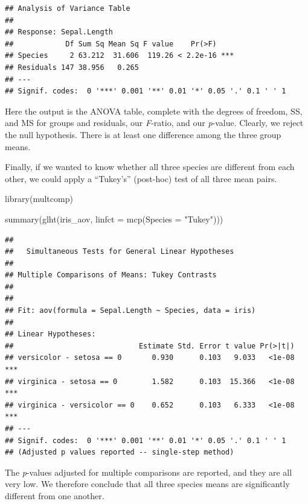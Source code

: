 \documentclass[
]{book}
\newenvironment{Shaded}{\begin{snugshade}}{\end{snugshade}}
\newcommand{\AttributeTok}[1]{\textcolor[rgb]{0.77,0.63,0.00}{#1}}
\newcommand{\FunctionTok}[1]{\textcolor[rgb]{0.00,0.00,0.00}{#1}}
\newcommand{\NormalTok}[1]{#1}
\newcommand{\StringTok}[1]{\textcolor[rgb]{0.31,0.60,0.02}{#1}}
\begin{document}
\begin{verbatim}
## Analysis of Variance Table
## 
## Response: Sepal.Length
##            Df Sum Sq Mean Sq F value    Pr(>F)    
## Species     2 63.212  31.606  119.26 < 2.2e-16 ***
## Residuals 147 38.956   0.265                      
## ---
## Signif. codes:  0 '***' 0.001 '**' 0.01 '*' 0.05 '.' 0.1 ' ' 1
\end{verbatim}

Here the output is the ANOVA table, complete with the degrees of freedom, SS, and MS for groups and residuals, our \emph{F}-ratio, and our \emph{p}-value. Clearly, we reject the null hypothesis. There is at least one difference among the three group means.

Finally, if we wanted to know whether all three species are different from each other, we could apply a ``Tukey's'' (post-hoc) test of all three mean pairs.

\begin{Shaded}
\begin{Highlighting}[]
\FunctionTok{library}\NormalTok{(multcomp)}
\end{Highlighting}
\end{Shaded}

\begin{Shaded}
\begin{Highlighting}[]
\FunctionTok{summary}\NormalTok{(}\FunctionTok{glht}\NormalTok{(iris\_aov, }\AttributeTok{linfct =} \FunctionTok{mcp}\NormalTok{(}\AttributeTok{Species =} \StringTok{"Tukey"}\NormalTok{)))}
\end{Highlighting}
\end{Shaded}

\begin{verbatim}
## 
##   Simultaneous Tests for General Linear Hypotheses
## 
## Multiple Comparisons of Means: Tukey Contrasts
## 
## 
## Fit: aov(formula = Sepal.Length ~ Species, data = iris)
## 
## Linear Hypotheses:
##                             Estimate Std. Error t value Pr(>|t|)    
## versicolor - setosa == 0       0.930      0.103   9.033   <1e-08 ***
## virginica - setosa == 0        1.582      0.103  15.366   <1e-08 ***
## virginica - versicolor == 0    0.652      0.103   6.333   <1e-08 ***
## ---
## Signif. codes:  0 '***' 0.001 '**' 0.01 '*' 0.05 '.' 0.1 ' ' 1
## (Adjusted p values reported -- single-step method)
\end{verbatim}

The \emph{p}-values adjusted for multiple comparisons are reported, and they are all very low. We therefore conclude that all three species means are significantly different from one another.
\end{document}
